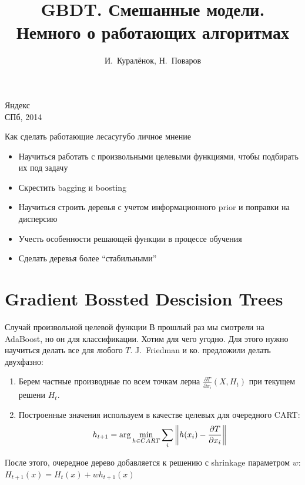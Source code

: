 \documentclass[14pt, fleqn, xcolor={dvipsnames, table}]{beamer}
\title{GBDT. Смешанные модели. \\\small{Немного о работающих алгоритмах}}
\author[]{\small{%
И.~Куралёнок,
Н.~Поваров}}
\date{}
\begin{document}
\begin{frame}
\maketitle
\small
\begin{center}
\vspace{-60pt}
\normalsize {\color{red}Я}ндекс \\
\vspace{80pt}
\footnotesize СПб, 2014
\end{center}
\end{frame}

\begin{frame}{Как сделать работающие леса}{сугубо личное мнение}
\begin{itemize}
  \item Научиться работать с произвольными целевыми функциями, чтобы подбирать их под задачу
  \item Скрестить bagging и boosting
  \item Научиться строить деревья с учетом информационного prior и поправки на дисперсию
  \item Учесть особенности решающей функции в процессе обучения
  \item Сделать деревья более ``стабильными''
\end{itemize}
\end{frame}

\section{Gradient Bossted Descision Trees}
\small
\begin{frame}{Случай произвольной целевой функции}
В прошлый раз мы смотрели на AdaBoost, но он для классификации. Хотим для чего угодно. Для этого нужно научиться делать все для любого $T$. J.~Friedman и ко. предложили делать двухфазно:
\begin{enumerate}
  \item Берем частные производные по всем точкам лерна  $\frac{\partial T}{\partial x_i}\left(X,H_t\right)$ при текущем решени $H_t$.
  \item Построенные значения используем в качестве целевых для очередного CART:
  $$
  h_{t+1} = \arg \min_{h \in CART} \sum_i \left\|h(x_i) - {\partial T \over \partial x_i}\right\|
  $$
\end{enumerate}
После этого, очередное дерево добавляется к решению с shrinkage параметром $w$: $H_{t+1}(x) = H_t(x) + w h_{t+1}(x)$
\end{frame}
\end{document}
